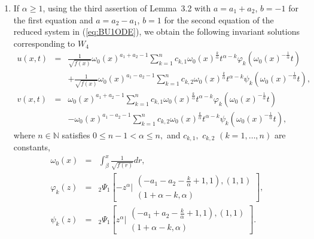 \documentclass[12pt]{amsart}
\begin{document}
\begin{enumerate}
\item If $\alpha \ge 1$, using the third assertion of Lemma~3.2 
\cite{ourFCAA}  
with $a = a_1 + a_2$, $b = -1$ for the first equation
and $a = a_2 - a_1$, $b = 1$ for the second equation of the reduced system in (\ref{eq:BU1ODE}), we obtain the following invariant solutions corresponding to $W_4$
\begin{eqnarray}\label{c3}
u(x,t) & = & \frac{1}{\sqrt{f(x)}}\omega_0(x)^{a_1+a_2-1}\sum\limits_{k=1}^nc_{k,1}\omega_0(x)^{\frac{k}{\alpha}}t^{\alpha-k}\varphi_k\left(\omega_0(x)^{-\frac{1}{\alpha}}t\right)\\
&&+\frac{1}{\sqrt{f(x)}}\omega_0(x)^{a_1-a_2-1}\sum\limits_{k=1}^nc_{k,2}\omega_0(x)^{\frac{k}{\alpha}}t^{\alpha-k}\psi_k\left(\omega_0(x)^{-\frac{1}{\alpha}}t\right),\nonumber\\
v(x,t) & = & \omega_0(x)^{a_1+a_2-1}\sum\limits_{k=1}^nc_{k,1}\omega_0(x)^{\frac{k}{\alpha}}t^{\alpha-k}\varphi_k\left(\omega_0(x)^{-\frac{1}{\alpha}}t\right)\\
&&-\omega_0(x)^{a_1-a_2-1}\sum\limits_{k=1}^nc_{k,2}\omega_0(x)^{\frac{k}{\alpha}}t^{\alpha-k}\psi_k\left(\omega_0(x)^{-\frac{1}{\alpha}}t\right),
\end{eqnarray}
where $n\in\mathbb{N}$ satisfies $0\leq n-1<\alpha\le n,$  and $c_{k,1},$ $c_{k,2}$ $(k=1,\dots,n)$ are constants,
\begin{eqnarray*}
\omega_{0}(x)&=&\int^x_{\beta} \frac{1}{\sqrt{f(r)}}dr,\\
\varphi_k(z) &=& {}_2\Psi_1\left[-z^{\alpha}\biggr\vert\begin{array}{c}
\left(-a_1-a_2-\frac{k}{\alpha}+1,1\right),(1,1)\\
(1+\alpha-k,\alpha)
\end{array}\right],\\
\psi_k(z) &=&  {}_2\Psi_1\left[z^{\alpha}\biggr\vert\begin{array}{c}
\left(-a_1+a_2-\frac{k}{\alpha}+1,1\right),(1,1)
\\
(1+\alpha-k,\alpha)
\end{array}\right].
\end{eqnarray*}
\end{enumerate}
\end{document}
